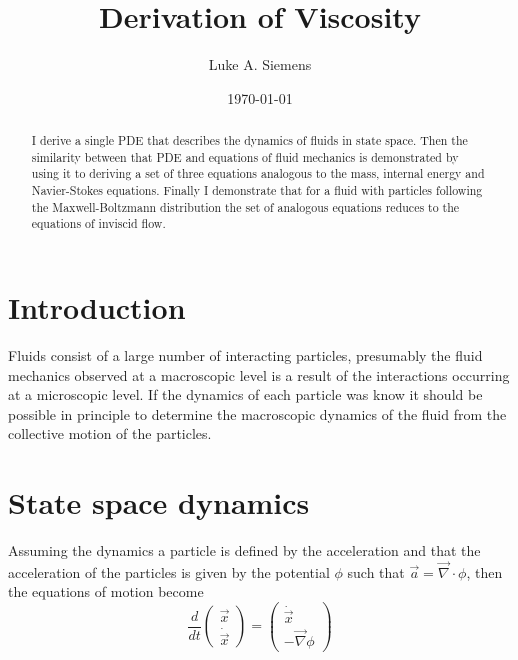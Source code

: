 \documentclass[%
 twocolumn,
 preprint, onecolumn,
 amsmath,amssymb,
 aps,
]{revtex4-1}
\newcommand{\dvec}[1]{\dot{\vec{#1}}}
\newcommand{\grad}{\vec{\nabla}}
\begin{document}
\title{Derivation of Viscosity}%

\author{Luke A. Siemens}

\date{\today}

\begin{abstract}
I derive a single PDE that describes the dynamics of fluids in state space. Then the similarity between that PDE and equations of fluid mechanics is demonstrated by using it to deriving a set of three equations analogous to the mass, internal energy and Navier-Stokes equations.  Finally I demonstrate that for a fluid with particles following the Maxwell-Boltzmann distribution the set of analogous equations reduces to the equations of inviscid flow.
\end{abstract}

\maketitle

\section{Introduction}

Fluids consist of a large number of interacting particles, presumably the fluid mechanics observed at a macroscopic level is a result of the interactions occurring at a microscopic level. If the dynamics of each particle was know it should be possible in principle to determine the macroscopic dynamics of the fluid from the collective motion of the particles. 

\section{State space dynamics}

Assuming the dynamics a particle is defined by the acceleration and that the acceleration of the particles is given by the potential $\phi$ such that $\vec{a} = \vec{\nabla}\cdot\phi$, then the equations of motion become
\[
\frac{d}{dt}\begin{pmatrix} \vec{x} \\ \dvec{x} \end{pmatrix}=\begin{pmatrix} \dvec{x} \\ -\grad\phi \end{pmatrix}
\]
\end{document}
